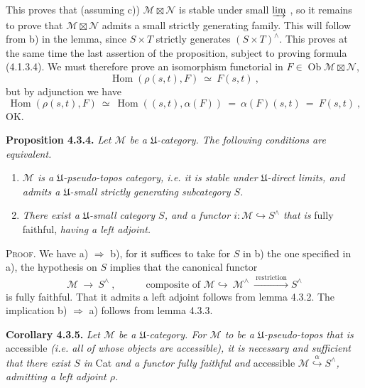 \documentclass[11pt]{article}
\newcommand{\printedpage}[1]{\marginpar{\footnotesize p.~#1}}
\newcommand{\msp}[1]{\marginpar{\footnotesize [#1]}}
\newcommand{\Hom}{\operatorname{Hom}}
\newcommand{\Ob}{\operatorname{Ob}}
\begin{document}
\noindent This proves that (assuming c)) $\mathcal M\boxtimes\mathcal N$ is stable under small $\varinjlim$ , so it remains to prove that $\mathcal M\boxtimes\mathcal N$ admits a small strictly generating family. This will follow from b) in the lemma, since $S\times T$ strictly generates $(S\times T)^\wedge$. This proves at the same time the last assertion of the proposition, subject to proving formula (4.1.3.4). We must therefore prove an isomorphism functorial in $F\in\Ob\mathcal M\boxtimes\mathcal N$, %
\[
\Hom(\rho(s,t),F)\ \simeq\ F(s,t)\ ,
\]
but by adjunction we have
\[
\Hom(\rho(s,t),F)\ \simeq\ \Hom((s,t),\alpha(F))\ =\ \alpha(F)(s,t)\ =\ F(s,t)\ ,
\]
OK.

\printedpage{11}

\noindent\msp{page 69}\textbf{Proposition 4.3.4.} \textit{Let $\mathcal M$ be a $\mathfrak U$-category. The following conditions are equivalent.}
\begin{enumerate}[label={}]
\item[\textit{a)}] \textit{$\mathcal M$ is a $\mathfrak U$-pseudo-topos category, i.e. it is stable under $\mathfrak U$-direct limits, and admits a $\mathfrak U$-small strictly generating subcategory $S$.}
\item[\textit{b)}] \textit{There exist a $\mathfrak U$-small category $S$, and a functor $i:\mathcal M\hookrightarrow S^\wedge$ that is} fully faithful, \textit{having a left adjoint.}
\end{enumerate}

\noindent\textsc{Proof}. We have a) $\Longrightarrow$ b), for it suffices to take for $S$ in b) the one specified in a), the hypothesis on $S$ implies that the canonical functor
\[
\mathcal M\ \longrightarrow\ S^\wedge\ ,\qquad\quad \text{composite of } \mathcal M\hookrightarrow\ \mathcal M^\wedge\ \xrightarrow{\ \text{restriction}\ }S^\wedge
\]
is fully faithful. That it admits a left adjoint follows from lemma 4.3.2. The implication b) $\Longrightarrow$ a) follows from lemma 4.3.3.

\noindent\textbf{Corollary 4.3.5.} \textit{Let $\mathcal M$ be a $\mathfrak U$-category. For $\mathcal M$ to be a $\mathfrak U$-pseudo-topos that is} accessible \textit{(i.e. all of whose objects are accessible), it is necessary and sufficient that there exist $S$ in} Cat \textit{and a functor fully faithful and} accessible $\mathcal M\overset{\alpha}{\hookrightarrow}S^\wedge$\textit{, admitting a left adjoint $\rho$.}
\end{document}
